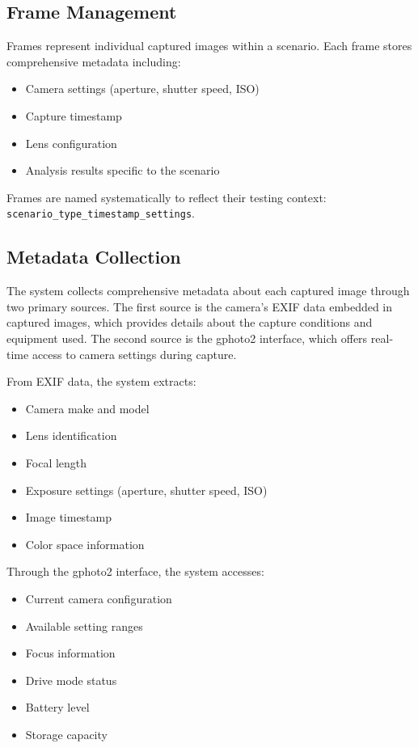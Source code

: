 \subsection{Frame Management}
Frames represent individual captured images within a scenario. Each frame stores comprehensive metadata including:
\begin{itemize}
    \item Camera settings (aperture, shutter speed, ISO)
    \item Capture timestamp
    \item Lens configuration
    \item Analysis results specific to the scenario
\end{itemize}

Frames are named systematically to reflect their testing context: \texttt{scenario\_type\_timestamp\_settings}.

\subsection{Metadata Collection}

The system collects comprehensive metadata about each captured image through two primary sources. The first source is the camera's EXIF data embedded in captured images, which provides details about the capture conditions and equipment used. The second source is the gphoto2 interface, which offers real-time access to camera settings during capture.

From EXIF data, the system extracts:
\begin{itemize}
    \item Camera make and model
    \item Lens identification
    \item Focal length
    \item Exposure settings (aperture, shutter speed, ISO)
    \item Image timestamp
    \item Color space information
\end{itemize}

Through the gphoto2 interface, the system accesses:
\begin{itemize}
    \item Current camera configuration
    \item Available setting ranges
    \item Focus information
    \item Drive mode status
    \item Battery level
    \item Storage capacity
\end{itemize}

